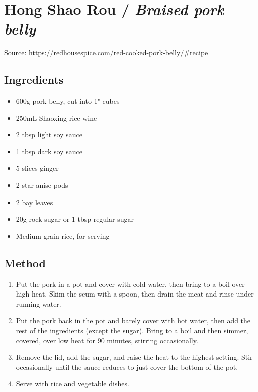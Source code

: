 \section{Hong Shao Rou / \emph{Braised pork belly}}


Source: https://redhousespice.com/red-cooked-pork-belly/\#recipe

\subsection{Ingredients}

\begin{itemize}
    \item 600g pork belly, cut into 1" cubes
    \item 250mL Shaoxing rice wine
    \item 2 tbsp light soy sauce
    \item 1 tbsp dark soy sauce
    \item 5 slices ginger
    \item 2 star-anise pods
    \item 2 bay leaves
    \item 20g rock sugar or 1 tbsp regular sugar
    \item Medium-grain rice, for serving
\end{itemize}

\subsection{Method}

\begin{enumerate}
    \item Put the pork in a pot and cover with cold water, then bring to a boil over high heat. Skim the scum with a spoon, then drain the meat and rinse under running water.
    \item Put the pork back in the pot and barely cover with hot water, then add the rest of the ingredients (except the sugar). Bring to a boil and then simmer, covered, over low heat for 90 minutes, stirring occasionally.
    \item Remove the lid, add the sugar, and raise the heat to the highest setting. Stir occasionally until the sauce reduces to just cover the bottom of the pot.
    \item Serve with rice and vegetable dishes.
\end{enumerate}
